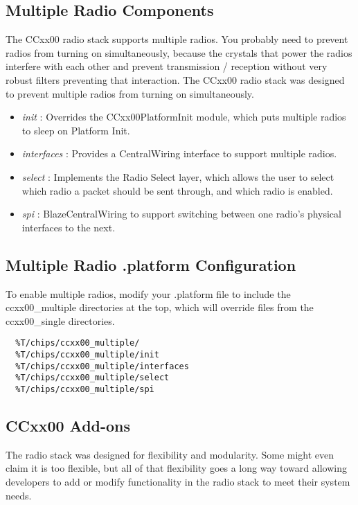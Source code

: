 \documentclass{article}
\begin{document}
\subsection{Multiple Radio Components}
\label{sec:multipleradiocomponents}

The CCxx00 radio stack supports multiple radios. You probably need to prevent radios 
from turning on simultaneously, because the crystals that power the radios interfere with
each other and prevent transmission / reception without very robust filters preventing
that interaction.  The CCxx00 radio stack was designed to prevent multiple radios from
turning on simultaneously.

\begin{itemize}
	\item \emph{init} : Overrides the CCxx00PlatformInit module, which puts multiple 
	radios to sleep on Platform Init.
	\item \emph{interfaces} : Provides a CentralWiring interface to support multiple 
	radios.
	\item \emph{select} : Implements the Radio Select layer, which allows the user to 
	select which radio a packet should be sent through, and which radio is enabled.
	\item \emph{spi} : BlazeCentralWiring to support switching between one 
	radio's physical interfaces to the next.
\end{itemize}

\subsection{Multiple Radio .platform Configuration}
To enable multiple radios, modify your .platform file to include the ccxx00\_multiple directories at the top, which will override files from the ccxx00\_single directories.

\begin{verbatim}
  %T/chips/ccxx00_multiple/
  %T/chips/ccxx00_multiple/init
  %T/chips/ccxx00_multiple/interfaces
  %T/chips/ccxx00_multiple/select
  %T/chips/ccxx00_multiple/spi
\end{verbatim}

\subsection{CCxx00 Add-ons}
\label{sec:ccxx00addons}
The radio stack was designed for flexibility and modularity. Some might even claim it is too flexible, but all of that flexibility goes a long way toward allowing developers to add or modify functionality in the radio stack to meet their system needs. 
\end{document}
